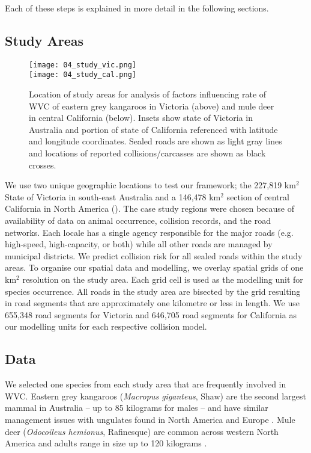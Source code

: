 Each of these steps is explained in more detail in the following sections.

\subsection{Study Areas}

\begin{figure*}[htp]
  \centering
  \texttt{[image: 04\_study\_vic.png]}\\
  \texttt{[image: 04\_study\_cal.png]}
  \caption[Locations of WVC for eastern grey kangaroos in Victoria and mule deer in central California]{Location of study areas for analysis of factors influencing rate of WVC of eastern grey kangaroos in Victoria (above) and mule deer in central California (below). Insets show state of Victoria in Australia and portion of state of California referenced with latitude and longitude coordinates.  Sealed roads are shown as light gray lines and locations of reported collisions/carcasses are shown as black crosses.}
  \label{cal_study_area}
\end{figure*}

We use two unique geographic locations to test our framework; the 227,819 km$^2$ State of Victoria in south-east Australia and a 146,478 km$^2$ section of central California in North America (). The case study regions were chosen because of availability of data on animal occurrence, collision records, and the road networks. Each locale has a single agency responsible for the major roads (e.g. high-speed, high-capacity, or both) while all other roads are managed by municipal districts. We predict collision risk for all sealed roads within the study areas. To organise our spatial data and modelling, we overlay spatial grids of one km$^2$ resolution on the study area. Each grid cell is used as the modelling unit for species occurrence. All roads in the study area are bisected by the grid resulting in road segments that are approximately one kilometre or less in length. We use 655,348 road segments for Victoria and 646,705 road segments for California as our modelling units for each respective collision model.

\subsection{Data}

We selected one species from each study area that are frequently involved in WVC. Eastern grey kangaroos (\textit{Macropus giganteus}, Shaw) are the second largest mammal in Australia -- up to 85 kilograms for males \citep{vand08} -- and have similar management issues with ungulates found in North America and Europe \citep{crof04,coul10}.  Mule deer (\textit{Odocoileus hemionus}, Rafinesque) are common across western North America and adults range in size up to 120 kilograms \citep{kays09}.

